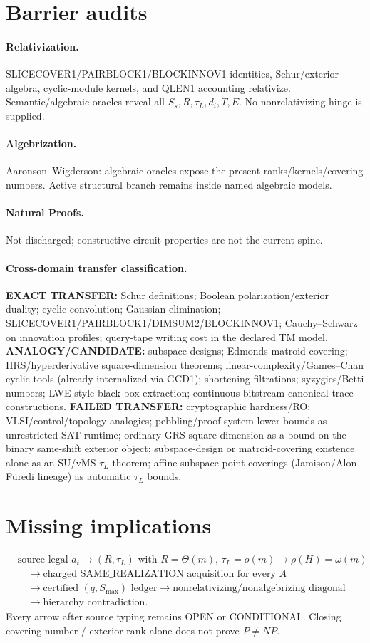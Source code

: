 \documentclass[11pt]{article}
\begin{document}
\section*{Barrier audits}
\paragraph{Relativization.}
SLICECOVER1/PAIRBLOCK1/BLOCKINNOV1 identities, Schur/exterior algebra, cyclic-module kernels, and QLEN1
accounting relativize. Semantic/algebraic oracles reveal all $S_s,R,\tau_L,d_i,T,E$. No nonrelativizing
hinge is supplied.
\paragraph{Algebrization.}
Aaronson--Wigderson: algebraic oracles expose the present ranks/kernels/covering numbers. Active structural
branch remains inside named algebraic models.
\paragraph{Natural Proofs.}
Not discharged; constructive circuit properties are not the current spine.
\paragraph{Cross-domain transfer classification.}
\textbf{EXACT TRANSFER:} Schur definitions; Boolean polarization/exterior duality; cyclic convolution;
Gaussian elimination; SLICECOVER1/PAIRBLOCK1/DIMSUM2/BLOCKINNOV1; Cauchy--Schwarz on innovation
profiles; query-tape writing cost in the declared TM model.
\textbf{ANALOGY/CANDIDATE:} subspace designs; Edmonds matroid covering; HRS/hyperderivative
square-dimension theorems; linear-complexity/Games--Chan cyclic tools (already internalized via GCD1);
shortening filtrations; syzygies/Betti numbers; LWE-style black-box extraction; continuous-bitstream
canonical-trace constructions.
\textbf{FAILED TRANSFER:} cryptographic hardness/RO; VLSI/control/topology analogies;
pebbling/proof-system lower bounds as unrestricted SAT runtime; ordinary GRS square dimension
as a bound on the binary same-shift exterior object; subspace-design or matroid-covering existence
alone as an SU/vMS $\tau_L$ theorem; affine subspace point-coverings (Jamison/Alon--F\"uredi lineage)
as automatic $\tau_L$ bounds.

\section*{Missing implications}
\[
\begin{aligned}
&\text{source-legal }a_t
\to (R,\tau_L)\text{ with }R=\Theta(m),\,\tau_L=o(m)
\to \rho(H)=\omega(m)\\
&\quad\to\text{charged SAME\_REALIZATION acquisition for every }A\\
&\quad\to\text{certified }(q,S_{\max})\text{ ledger}
\to\text{nonrelativizing/nonalgebrizing diagonal}\\
&\quad\to\text{hierarchy contradiction}.
\end{aligned}
\]
Every arrow after source typing remains OPEN or CONDITIONAL. Closing covering-number / exterior
rank alone does not prove $P\neq NP$.
\end{document}
